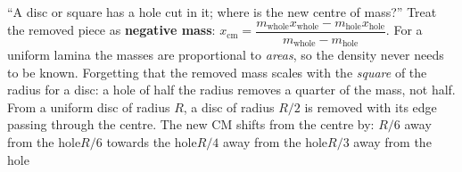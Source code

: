 {``A disc or square has a hole cut in it; where is the new centre of mass?''}
{Treat the removed piece as \textbf{negative mass}:
$x_{\text{cm}}=\dfrac{m_{\text{whole}}x_{\text{whole}}-m_{\text{hole}}x_{\text{hole}}}{m_{\text{whole}}-m_{\text{hole}}}$.
For a uniform lamina the masses are proportional to \emph{areas}, so the density never needs to be known.}
{Forgetting that the removed mass scales with the \emph{square} of the radius for a disc: a hole of
half the radius removes a quarter of the mass, not half.}
{From a uniform disc of radius $R$, a disc of radius $R/2$ is removed with its edge passing through the
centre. The new CM shifts from the centre by:}
{$R/6$ away from the hole}{$R/6$ towards the hole}{$R/4$ away from the hole}{$R/3$ away from the hole}
